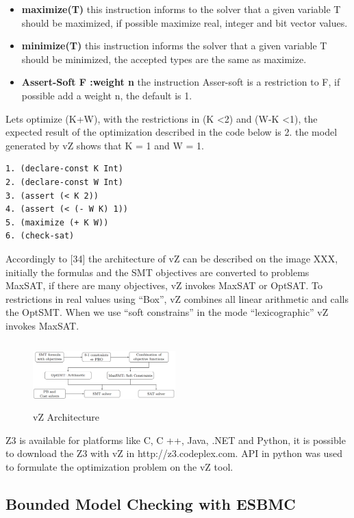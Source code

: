 \begin{itemize}
\item{\textbf{maximize(T)}
this instruction informs to the solver that a given variable T should be maximized, if possible maximize real, integer and bit vector values.}
\item{\textbf{minimize(T)}
this instruction informs the solver that a given variable T should be minimized, the accepted types are the same as maximize.}
\item{\textbf{Assert-Soft F :weight n}
the instruction Asser-soft is a restriction to F, if possible add a weight n, the default is 1.}
\end{itemize}

Lets optimize (K+W), with the restrictions in (K \textless 2) and (W-K \textless 1), the expected result of the optimization described in the code below is 2. the model generated by vZ shows that K = 1 and W = 1.

\begin{lstlisting}
1. (declare-const K Int) 
2. (declare-const W Int)
3. (assert (< K 2)) 
4. (assert (< (- W K) 1))
5. (maximize (+ K W)) 
6. (check-sat)
\end{lstlisting}


Accordingly to [34] the architecture of vZ can be described on the image XXX, initially the formulas and the SMT objectives are converted to problems MaxSAT, if there are many objectives, vZ invokes MaxSAT or OptSAT. To restrictions in real values using “Box”, vZ combines all linear arithmetic and calls the OptSMT. When we use “soft constrains” in the mode “lexicographic” vZ invokes MaxSAT.
\begin{figure}[ht]
	\centering
  \includegraphics[width=0.49\textwidth, height=95px]{Image/vzArch.png} 
	\caption{vZ Architecture}
	\label{fig2}
\end{figure}

Z3 is available for platforms like C, C ++, Java, .NET and Python, it is possible to download the Z3 with vZ in http://z3.codeplex.com. API in python was used to formulate the optimization problem on the vZ tool. 

\subsection{Bounded Model Checking with ESBMC}


